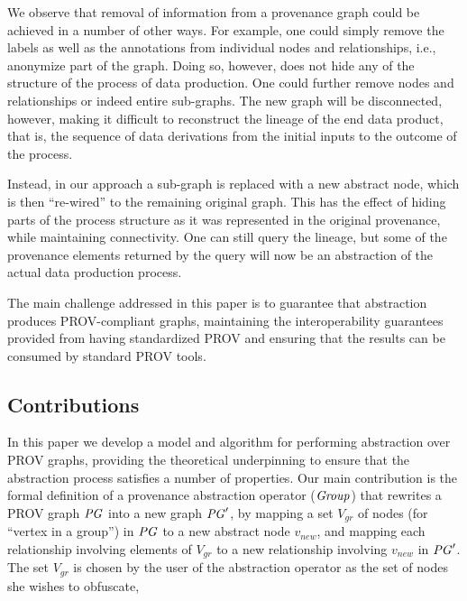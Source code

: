 We observe that removal of information from a provenance graph could be achieved in a number of other ways.
%
For example, one could simply remove the labels as well as the annotations from individual nodes and relationships, i.e., anonymize part of the graph. Doing so, however, does not hide any of the structure of the process of data production. One could further remove nodes and relationships or  indeed entire sub-graphs. The new graph will be disconnected, however, making it difficult to reconstruct the lineage of the end data product, that is, the sequence of data derivations from the initial inputs to the outcome of the process.

Instead, in our approach a sub-graph is replaced with a new abstract node, which is then ``re-wired'' to the remaining original graph. This has the effect of hiding parts of the process structure as it was represented in the original provenance, while maintaining connectivity. One can still query the lineage, but some of the provenance elements returned by the query will now be an abstraction of the actual data production process.

The main challenge addressed in this paper is to guarantee that abstraction produces PROV-compliant  graphs,   maintaining the interoperability guarantees provided from having standardized PROV and ensuring that the results can be consumed by standard PROV tools. %

\subsection{Contributions} \label{sec:contributions}

In this paper we develop a model and algorithm for performing  abstraction over PROV graphs, providing the theoretical underpinning to ensure that the abstraction process satisfies a number of properties.
%
Our main contribution is the formal  definition of a provenance abstraction operator ($\mathit{Group}$) that  rewrites  a PROV graph $\mathit{PG}$ into a new graph $\mathit{PG}'$, by  mapping a set $V_{gr}$ of nodes (for ``vertex in a group'') in $\mathit{PG}$ to a new abstract node $v_{new}$, and  mapping each relationship involving elements of $V_{gr}$  to a new relationship involving $v_{new}$ in $\mathit{PG}'$. 
The set $V_{gr}$ is chosen by the user of the abstraction operator as the set of nodes she wishes to obfuscate, 

